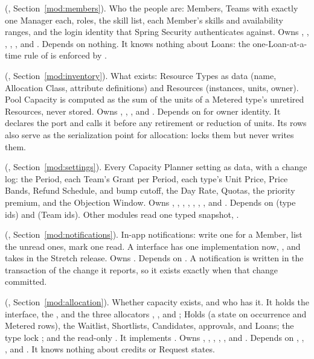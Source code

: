 \textbf{} (, Section~\ref{mod:members}). Who the people are: Members, Teams with exactly one Manager each, roles, the skill list, each Member's skills and availability ranges, and the login identity that Spring Security authenticates against. Owns , , , , , and . Depends on nothing. It knows nothing about Loans: the one-Loan-at-a-time rule of  is enforced by .

\textbf{} (, Section~\ref{mod:inventory}). What exists: Resource Types as data (name, Allocation Class, attribute definitions) and Resources (instances, units, owner). Pool Capacity is computed as the sum of the units of a Metered type's unretired Resources, never stored. Owns , , , and . Depends on  for owner identity. It declares the port  and calls it before any retirement or reduction of units. Its  rows also serve as the serialization point for allocation:  locks them but never writes them.

\textbf{} (, Section~\ref{mod:settings}). Every Capacity Planner setting as data, with a change log: the Period, each Team's Grant per Period, each type's Unit Price, Price Bands, Refund Schedule, and bump cutoff, the Day Rate, Quotas, the priority premium, and the Objection Window. Owns , , , , , , , and . Depends on  (type ids) and  (Team ids). Other modules read one typed snapshot, .

\textbf{} (, Section~\ref{mod:notifications}). In-app notifications: write one for a Member, list the unread ones, mark one read. A  interface has one implementation now, , and takes  in the Stretch release. Owns . Depends on . A notification is written in the transaction of the change it reports, so it exists exactly when that change committed.

\textbf{} (, Section~\ref{mod:allocation}). Whether capacity exists, and who has it. It holds the  interface, the , and the three allocators , , and ; Holds (a state on occurrence and Metered rows), the Waitlist, Shortlists, Candidates, approvals, and Loans; the type lock ; and the read-only . It implements . Owns , , , , , and . Depends on , , , and . It knows nothing about credits or Request states.


